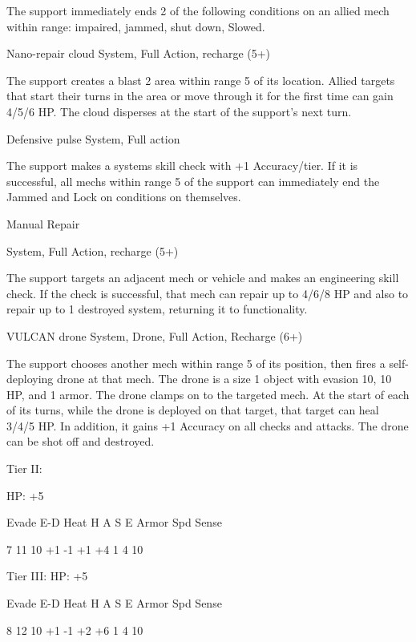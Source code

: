 The support immediately ends 2 of the following conditions on an allied mech within range:  
impaired, jammed, shut down, Slowed. 
 

Nano-repair cloud  
System, Full Action, recharge (5+)
 
The support creates a blast 2 area within range 5 of its location. Allied targets that start their  
turns in the area or move through it for the first time can gain 4/5/6 HP. The cloud disperses at  
the start of the support’s next turn.
 

Defensive pulse  
System, Full action
 
The support makes a systems skill check with +1 Accuracy/tier. If it is successful, all mechs  
within range 5 of the support can immediately end the Jammed and Lock on conditions on  
themselves.
 

Manual Repair
 
System, Full Action, recharge (5+)
 
The support targets an adjacent mech or vehicle and makes an engineering skill check. If the  
check is successful, that mech can repair up to 4/6/8 HP and also to repair up to 1 destroyed  
system, returning it to functionality.
 

VULCAN drone  
System, Drone, Full Action, Recharge (6+)
 
The support chooses another mech within range 5 of its position, then fires a self-deploying  
drone at that mech. The drone is a size 1 object with evasion 10, 10 HP, and 1 armor. The drone  
clamps on to the targeted mech. At the start of each of its turns, while the drone is deployed on  
that target, that target can heal 3/4/5 HP. In addition, it gains +1 Accuracy on all checks and  
attacks. The drone can be shot off and destroyed.
 

Tier II:
 
HP: +5
 

          Evade    E-D    Heat     H    A     S     E       Armor        Spd      Sense 

          7        11     10       +1   -1    +1    +4      1            4        10 

Tier III:  
HP: +5
 

          Evade    E-D    Heat     H    A     S     E       Armor        Spd      Sense 

          8        12     10       +1   -1    +2    +6      1            4        10 

                                                                                                                